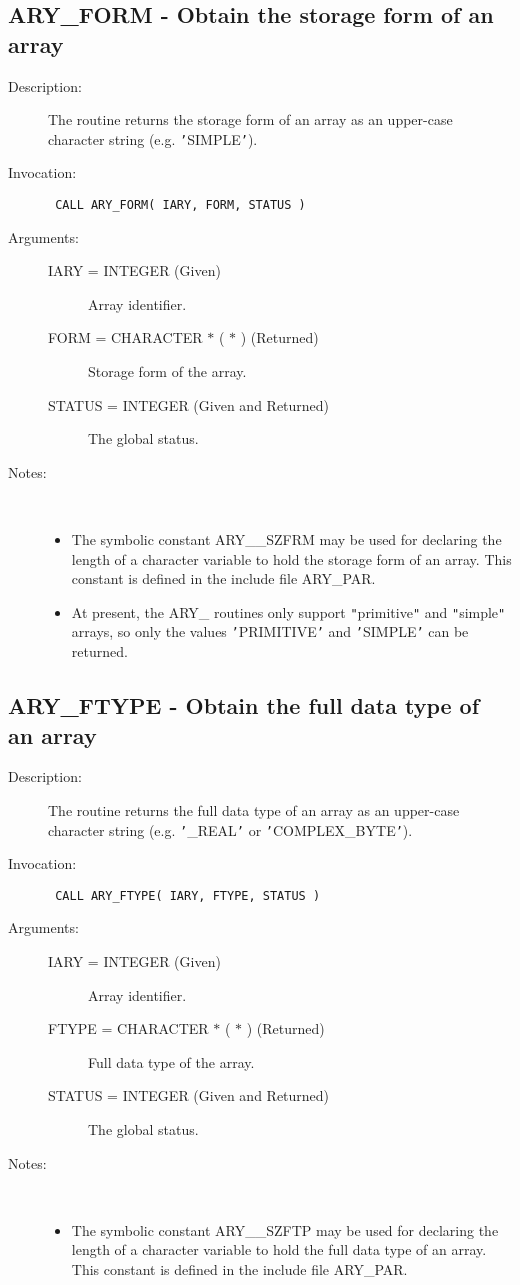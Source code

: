 \documentclass[twoside,11pt]{article}
\newcommand{\xlabel}[1]{}
\newlength{\sstbannerlength}
\newlength{\sstcaptionlength}
\newlength{\sstexampleslength}
\newlength{\sstexampleswidth}
\newcommand{\sstroutine}[3]{
   \goodbreak
   \rule{\textwidth}{0.5mm}
   \vspace{-7ex}
   \newline
   \settowidth{\sstbannerlength}{{\Large {\bf #1}}}
   \setlength{\sstcaptionlength}{\textwidth}
   \setlength{\sstexampleslength}{\textwidth}
   \addtolength{\sstbannerlength}{0.5em}
   \addtolength{\sstcaptionlength}{-2.0\sstbannerlength}
   \addtolength{\sstcaptionlength}{-5.0pt}
   \settowidth{\sstexampleswidth}{{\bf Examples:}}
   \addtolength{\sstexampleslength}{-\sstexampleswidth}
   \parbox[t]{\sstbannerlength}{\flushleft{\Large {\bf #1}}}
   \parbox[t]{\sstcaptionlength}{\center{\Large #2}}
   \parbox[t]{\sstbannerlength}{\flushright{\Large {\bf #1}}}
   \begin{description}
      #3
   \end{description}
}
\newcommand{\sstdescription}[1]{\item[Description:] #1}
\newcommand{\sstinvocation}[1]{\item[Invocation:]\hspace{0.4em}{\tt #1}}
\newcommand{\sstarguments}[1]{
   \item[Arguments:] \mbox{} \\
   \vspace{-3.5ex}
   \begin{description}
      #1
   \end{description}
}
\newcommand{\sstsubsection}[1]{ \item[{#1}] \mbox{} \\}
\newcommand{\sstnotes}[1]{\item[Notes:] \mbox{} \\[1.3ex] #1}
\newcommand{\sstitemlist}[1]{
  \mbox{} \\
  \vspace{-3.5ex}
  \begin{itemize}
     #1
  \end{itemize}
}
\newcommand{\sstitem}{\item}
\newcommand{\ssttt}{\tt}
\renewcommand{\sstroutine}[3]{
      \subsection{#1\xlabel{#1}-\label{#1}#2}
      \begin{description}
         #3
      \end{description}
   }
\renewcommand{\sstdescription}[1]{\item[Description:]
      \begin{description}
         #1
      \end{description}
   }
\renewcommand{\sstinvocation}[1]{\item[Invocation:]
      \begin{description}
         {\ssttt #1}
      \end{description}
   }
\renewcommand{\sstarguments}[1]{
      \item[Arguments:]
      \begin{description}
         #1
      \end{description}
   }
\renewcommand{\sstsubsection}[1]{\item[{#1}]}
\renewcommand{\sstnotes}[1]{\item[Notes:]
      \begin{description}
         #1
      \end{description}
   }
\newcommand{\sstitemlist}[1]{
      \begin{itemize}
         #1
      \end{itemize}
   }
\begin{document}
\sstroutine{
   ARY\_FORM
}{
   Obtain the storage form of an array
}{
   \sstdescription{
      The routine returns the storage form of an array as an upper-case
      character string (e.g. {\tt '}SIMPLE{\tt '}).
   }
   \sstinvocation{
      CALL ARY\_FORM( IARY, FORM, STATUS )
   }
   \sstarguments{
      \sstsubsection{
         IARY = INTEGER (Given)
      }{
         Array identifier.
      }
      \sstsubsection{
         FORM = CHARACTER $*$ ( $*$ ) (Returned)
      }{
         Storage form of the array.
      }
      \sstsubsection{
         STATUS = INTEGER (Given and Returned)
      }{
         The global status.
      }
   }
   \sstnotes{
      \sstitemlist{

         \sstitem
         The symbolic constant ARY\_\_SZFRM may be used for declaring the
         length of a character variable to hold the storage form of an
         array. This constant is defined in the include file ARY\_PAR.

         \sstitem
         At present, the ARY\_ routines only support {\tt "}primitive{\tt "} and
         {\tt "}simple{\tt "} arrays, so only the values {\tt '}PRIMITIVE{\tt '} and {\tt '}SIMPLE{\tt '} can
         be returned.
      }
   }
}
\sstroutine{
   ARY\_FTYPE
}{
   Obtain the full data type of an array
}{
   \sstdescription{
      The routine returns the full data type of an array as an
      upper-case character string (e.g. {\tt '}\_REAL{\tt '} or {\tt '}COMPLEX\_BYTE{\tt '}).
   }
   \sstinvocation{
      CALL ARY\_FTYPE( IARY, FTYPE, STATUS )
   }
   \sstarguments{
      \sstsubsection{
         IARY = INTEGER (Given)
      }{
         Array identifier.
      }
      \sstsubsection{
         FTYPE = CHARACTER $*$ ( $*$ ) (Returned)
      }{
         Full data type of the array.
      }
      \sstsubsection{
         STATUS = INTEGER (Given and Returned)
      }{
         The global status.
      }
   }
   \sstnotes{
      \sstitemlist{

         \sstitem
         The symbolic constant ARY\_\_SZFTP may be used for declaring the
         length of a character variable to hold the full data type of an
         array. This constant is defined in the include file ARY\_PAR.
      }
   }
}
\end{document}
